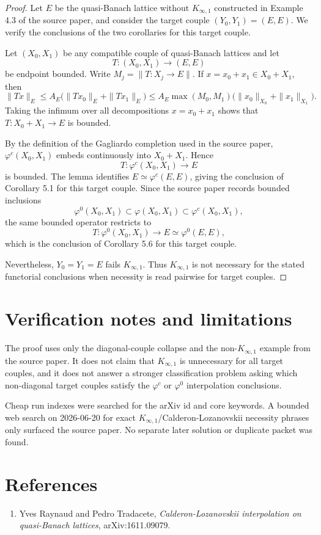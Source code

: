 \documentclass[11pt]{article}
\newcommand{\Kinf}{K_{\infty,1}}
\newcommand{\phic}{\varphi^c}
\newcommand{\phiz}{\varphi^0}
\begin{document}
\begin{proof}
Let \(E\) be the quasi-Banach lattice without \(\Kinf\) constructed in Example 4.3 of the source paper, and consider the target couple \((Y_0,Y_1)=(E,E)\). We verify the conclusions of the two corollaries for this target couple.

Let \((X_0,X_1)\) be any compatible couple of quasi-Banach lattices and let
\[
T:(X_0,X_1)\to(E,E)
\]
be endpoint bounded. Write \(M_j=\|T:X_j\to E\|\). If \(x=x_0+x_1\in X_0+X_1\), then
\[
\|Tx\|_E\leq A_E\bigl(\|Tx_0\|_E+\|Tx_1\|_E\bigr)
\leq A_E\max(M_0,M_1)\bigl(\|x_0\|_{X_0}+\|x_1\|_{X_1}\bigr).
\]
Taking the infimum over all decompositions \(x=x_0+x_1\) shows that \(T:X_0+X_1\to E\) is bounded.

By the definition of the Gagliardo completion used in the source paper, \(\phic(X_0,X_1)\) embeds continuously into \(X_0+X_1\). Hence
\[
T:\phic(X_0,X_1)\to E
\]
is bounded. The lemma identifies \(E\simeq\phic(E,E)\), giving the conclusion of Corollary 5.1 for this target couple. Since the source paper records bounded inclusions
\[
\phiz(X_0,X_1)\subset \varphi(X_0,X_1)\subset \phic(X_0,X_1),
\]
the same bounded operator restricts to
\[
T:\phiz(X_0,X_1)\to E\simeq\phiz(E,E),
\]
which is the conclusion of Corollary 5.6 for this target couple.

Nevertheless, \(Y_0=Y_1=E\) fails \(\Kinf\). Thus \(\Kinf\) is not necessary for the stated functorial conclusions when necessity is read pairwise for target couples.
\end{proof}

\section*{Verification notes and limitations}

The proof uses only the diagonal-couple collapse and the non-\(\Kinf\) example from the source paper. It does not claim that \(\Kinf\) is unnecessary for all target couples, and it does not answer a stronger classification problem asking which non-diagonal target couples satisfy the \(\phic\) or \(\phiz\) interpolation conclusions.

Cheap run indexes were searched for the arXiv id and core keywords. A bounded web search on 2026-06-20 for exact \(K_{\infty,1}\)/Calderon-Lozanovskii necessity phrases only surfaced the source paper. No separate later solution or duplicate packet was found.

\section*{References}

\begin{enumerate}
\item Yves Raynaud and Pedro Tradacete, \emph{Calderon-Lozanovskii interpolation on quasi-Banach lattices}, arXiv:1611.09079.
\end{enumerate}
\end{document}
